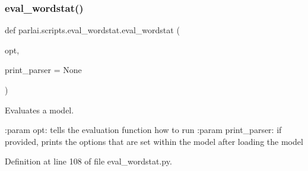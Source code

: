 \subsubsection{\texorpdfstring{eval\+\_\+wordstat()}{eval\_wordstat()}}
{\footnotesize\ttfamily def parlai.\+scripts.\+eval\+\_\+wordstat.\+eval\+\_\+wordstat (\begin{DoxyParamCaption}\item[{}]{opt,  }\item[{}]{print\+\_\+parser = {\ttfamily None} }\end{DoxyParamCaption})}

\begin{DoxyVerb}Evaluates a model.

:param opt: tells the evaluation function how to run
:param print_parser: if provided, prints the options that are set within the
    model after loading the model
\end{DoxyVerb}
 

Definition at line 108 of file eval\+\_\+wordstat.\+py.



